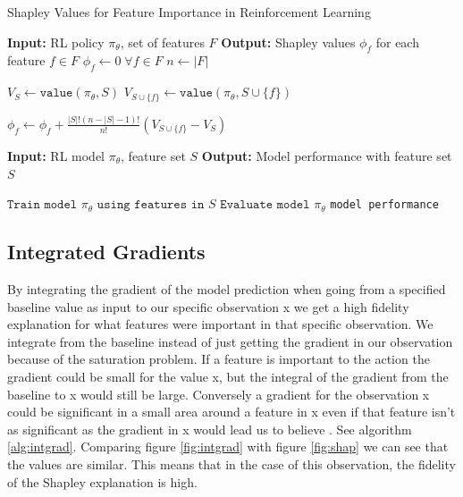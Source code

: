 \documentclass[UKenglish]{uiomasterthesis}
\begin{document}
\begin{algorithm}
\caption{Shapley Values for Feature Importance in Reinforcement Learning}
\label{alg:shapley}
\begin{algorithmic}
    \State \textbf{Input:} RL policy $\pi_\theta$, set of features $F$
    \State \textbf{Output:} Shapley values $\phi_f$ for each feature $f \in F$
    \State $\phi_f \gets 0 \; \forall f \in F$ 
    \State $n \gets |F|$ 
    
            \State $V_S \gets \texttt{value}(\pi_\theta, S)$ 
            \State $V_{S \cup \{f\}} \gets \texttt{value}(\pi_\theta, S \cup \{f\})$ 
            
            \State $\phi_f \gets \phi_f + \frac{|S|!(n - |S| - 1)!}{n!} \left(V_{S \cup \{f\}} - V_S\right)$
        \EndFor
    \EndFor
    
        \State \textbf{Input:} RL model $\pi_\theta$, feature set $S$
        \State \textbf{Output:} Model performance with feature set $S$
        
        \State $\texttt{Train model } \pi_\theta \texttt{ using features in } S$
        \State $\texttt{Evaluate model } \pi_\theta$
        \State \Return \texttt{model performance}
    \EndFunction
\end{algorithmic}
\end{algorithm}

\subsection{Integrated Gradients}
\label{sec:intgrad}
By integrating the gradient of the model prediction when going from a specified baseline value as input to our specific observation x we get a high fidelity explanation for what features were important in that specific observation. We integrate from the baseline instead of just getting the gradient in our observation because of the saturation problem. If a feature is important to the action the gradient could be small for the value x, but the integral of the gradient from the baseline to x would still be large. Conversely a gradient for the observation x could be significant in a small area around a feature in x even if that feature isn't as significant as the gradient in x would lead us to believe \cite{sundararajan2017axiomaticattributiondeepnetworks}. See algorithm \ref{alg:intgrad}. Comparing figure \ref{fig:intgrad} with figure \ref{fig:shap} we can see that the values are similar. This means that in the case of this observation, the fidelity of the Shapley explanation is high.
\end{document}
